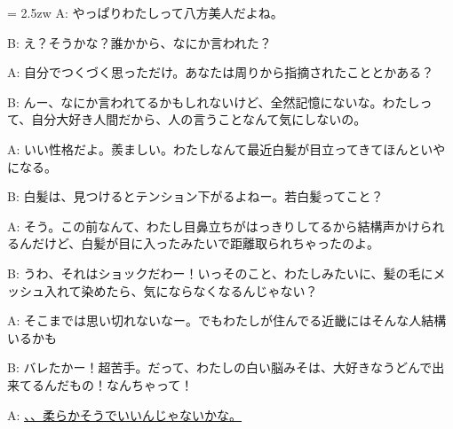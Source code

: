 \documentclass[11pt]{amsart}
\title{}
\author{}
\newenvironment{hangall}[1]{\hangindent = 2.5zw\everypar{\hangindent = 2.5zw}}{}
\begin{document}
\maketitle
\begin{hangall}{}%
A: やっぱりわたしって八方美人だよね。

B: え？そうかな？誰かから、なにか言われた？

A: 自分でつくづく思っただけ。あなたは周りから指摘されたこととかある？

B: んー、なにか言われてるかもしれないけど、全然記憶にないな。わたしって、自分大好き人間だから、人の言うことなんて気にしないの。

A: いい性格だよ。羨ましい。わたしなんて最近白髪が目立ってきてほんといやになる。

B: 白髪は、見つけるとテンション下がるよねー。若白髪ってこと？

A: そう。この前なんて、わたし目鼻立ちがはっきりしてるから結構声かけられるんだけど、白髪が目に入ったみたいで距離取られちゃったのよ。

B: うわ、それはショックだわー！いっそのこと、わたしみたいに、髪の毛にメッシュ入れて染めたら、気にならなくなるんじゃない？

A: そこまでは思い切れないなー。でもわたしが住んでる近畿にはそんな人結構いるかも

B: バレたかー！超苦手。だって、わたしの白い脳みそは、大好きなうどんで出来てるんだもの！なんちゃって！

A: \ul{、、柔らかそうでいいんじゃないかな。}\end{hangall}
\end{document}
